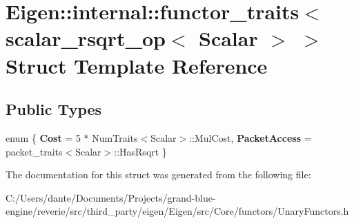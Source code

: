 \hypertarget{struct_eigen_1_1internal_1_1functor__traits_3_01scalar__rsqrt__op_3_01_scalar_01_4_01_4}{}\section{Eigen\+::internal\+::functor\+\_\+traits$<$ scalar\+\_\+rsqrt\+\_\+op$<$ Scalar $>$ $>$ Struct Template Reference}
\label{struct_eigen_1_1internal_1_1functor__traits_3_01scalar__rsqrt__op_3_01_scalar_01_4_01_4}
\subsection*{Public Types}
\begin{DoxyCompactItemize}
\item 
\mbox{\label{struct_eigen_1_1internal_1_1functor__traits_3_01scalar__rsqrt__op_3_01_scalar_01_4_01_4_a5ebbd71d03dc101374678747ab88be0b}} 
enum \{ {\bfseries Cost} = 5 $\ast$ Num\+Traits$<$Scalar$>$\+::Mul\+Cost, 
{\bfseries Packet\+Access} = packet\+\_\+traits$<$Scalar$>$\+::Has\+Rsqrt
 \}
\end{DoxyCompactItemize}


The documentation for this struct was generated from the following file\+:\begin{DoxyCompactItemize}
\item 
C\+:/\+Users/dante/\+Documents/\+Projects/grand-\/blue-\/engine/reverie/src/third\+\_\+party/eigen/\+Eigen/src/\+Core/functors/Unary\+Functors.\+h\end{DoxyCompactItemize}
